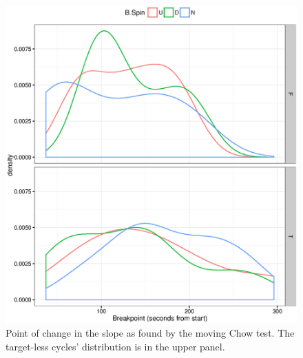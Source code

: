 \documentclass{report}
\begin{document}
\begin{figure}
	\centering
	\includegraphics{FStats_BP_dens.eps}
	\caption{Point of change in the slope as found by the moving Chow test. The target-less cycles' distribution is in the upper panel.\label{FStat_BP_dens}}
\end{figure}
\end{document}
